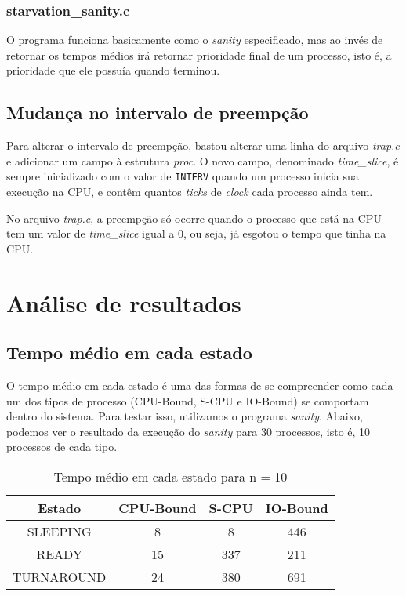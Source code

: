 \documentclass{article}
\begin{document}
\subsubsection{starvation\_sanity.c}

O programa funciona basicamente como o \textit{sanity} especificado, mas ao
invés de retornar os tempos médios irá retornar prioridade final de um
processo, isto é, a prioridade que ele possuía quando terminou.

\subsection{Mudança no intervalo de preempção}

Para alterar o intervalo de preempção, bastou alterar uma linha do arquivo
\textit{trap.c} e adicionar um campo à estrutura \textit{proc}. O novo campo,
denominado \textit{time\_slice}, é sempre inicializado com o valor de
\texttt{INTERV} quando um processo inicia sua execução na CPU, e contêm quantos
\textit{ticks} de \textit{clock} cada processo ainda tem.

No arquivo \textit{trap.c}, a preempção só ocorre quando o processo que está na
CPU tem um valor de \textit{time\_slice} igual a 0, ou seja, já esgotou o tempo
que tinha na CPU.

\section{Análise de resultados}

\subsection{Tempo médio em cada estado}

O tempo médio em cada estado é uma das formas de se compreender como cada um
dos tipos de processo (CPU-Bound, S-CPU e IO-Bound) se comportam dentro do
sistema. Para testar isso, utilizamos o programa \textit{sanity}. Abaixo,
podemos ver o resultado da execução do \textit{sanity} para 30 processos, isto
é, 10 processos de cada tipo.

\begin{table}[H]
      \centering
      \begin{tabular}{|c|c|c|c|}
            \hline
            Estado     & CPU-Bound & S-CPU & IO-Bound
            \\
            \hline
            SLEEPING   & 8         & 8     & 446      \\
            READY      & 15        & 337   & 211      \\
            TURNAROUND & 24        & 380   & 691      \\
            \hline
      \end{tabular}
      \caption{Tempo médio em cada estado para n = 10}
\end{table}
\end{document}
